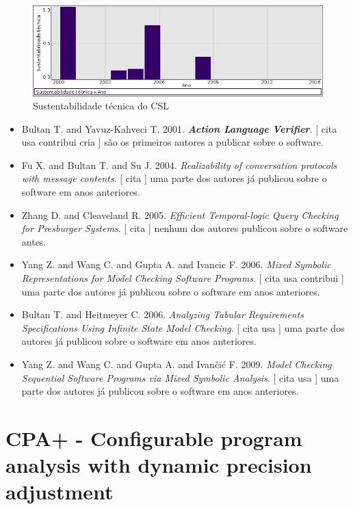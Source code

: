 \begin{figure}[h]
  \center
  \includegraphics[scale=0.50]{imagens/softwares-charts/composite.png}
  \caption{Sustentabilidade técnica do CSL}
\end{figure}


\begin{itemize}
\item Bultan T. and Yavuz-Kahveci T.
      2001.
        \textbf{\textit{ Action Language Verifier}}.
      [
          cita
          usa
          contribui
          cria
      ]
são os primeiros autores a publicar sobre o software.
\item Fu X. and Bultan T. and Su J.
      2004.
        \textit{ Realizability of conversation protocols with message contents}.
      [
          cita
      ]
uma parte dos autores já publicou sobre o software em anos anteriores.
\item Zhang D. and Cleaveland R.
      2005.
        \textit{ Efficient Temporal-logic Query Checking for Presburger Systems}.
      [
          cita
      ]
nenhum dos autores publicou sobre o software antes.
\item Yang Z. and Wang C. and Gupta A. and Ivancic F.
      2006.
        \textit{ Mixed Symbolic Representations for Model Checking Software Programs}.
      [
          cita
          usa
          contribui
      ]
uma parte dos autores já publicou sobre o software em anos anteriores.
\item Bultan T. and Heitmeyer C.
      2006.
        \textit{ Analyzing Tabular Requirements Specifications Using Infinite State Model Checking}.
      [
          cita
          usa
      ]
uma parte dos autores já publicou sobre o software em anos anteriores.
\item Yang Z. and Wang C. and Gupta A. and Ivan\v{c}i\'{c} F.
      2009.
        \textit{ Model Checking Sequential Software Programs via Mixed Symbolic Analysis}.
      [
          cita
          usa
      ]
uma parte dos autores já publicou sobre o software em anos anteriores.
\end{itemize}
\section{CPA+ - Configurable program analysis with dynamic precision adjustment}

